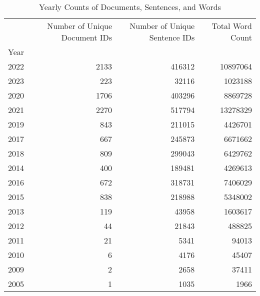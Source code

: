 \begin{table}
\caption{Yearly Counts of Documents, Sentences, and Words}
\begin{tabular}{lrrr}
\toprule
 & Number of Unique Document IDs & Number of Unique Sentence IDs & Total Word Count \\
Year &  &  &  \\
\midrule
2022 & 2133 & 416312 & 10897064 \\
2023 & 223 & 32116 & 1023188 \\
2020 & 1706 & 403296 & 8869728 \\
2021 & 2270 & 517794 & 13278329 \\
2019 & 843 & 211015 & 4426701 \\
2017 & 667 & 245873 & 6671662 \\
2018 & 809 & 299043 & 6429762 \\
2014 & 400 & 189481 & 4269613 \\
2016 & 672 & 318731 & 7406029 \\
2015 & 838 & 218988 & 5348002 \\
2013 & 119 & 43958 & 1603617 \\
2012 & 44 & 21843 & 488825 \\
2011 & 21 & 5341 & 94013 \\
2010 & 6 & 4176 & 45407 \\
2009 & 2 & 2658 & 37411 \\
2005 & 1 & 1035 & 1966 \\
\bottomrule
\end{tabular}
\end{table}
